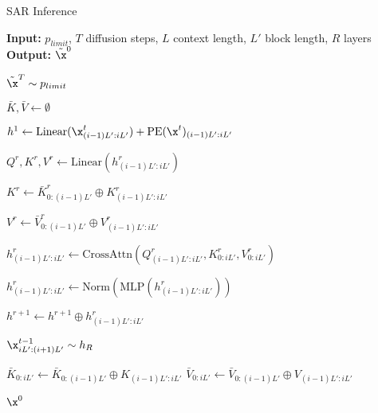 \begin{algorithm}
\caption{SAR Inference}
\begin{algorithmic}[1]
\State \textbf{Input:} $p_{limit}$, $T$ diffusion steps, $L$ context length, $L'$ block length, $R$ layers
\State \textbf{Output:} $\tilde{\x}^0$

\State $\tilde{\x}^T \sim p_{limit}$

\State $\bar{K}, \bar{V} \gets \emptyset$

        \State $h^1 \gets \text{Linear}(\x^t_{(i-1)L':iL'}) + \text{PE}(\x^t)_{(i-1)L':iL'}$
        
            \State $Q^r, K^r, V^r \gets \text{Linear}(h^r_{(i-1)L':iL'})$
            
            \State $K^r \gets \bar{K}^r_{0:(i-1)L'} \oplus K^r_{(i-1)L':iL'}$
            
            \State $V^r \gets \bar{V}^r_{0:(i-1)L'} \oplus V^r_{(i-1)L':iL'}$
            
            \State $h^r_{(i-1)L':iL'} \gets \text{CrossAttn}(Q^r_{(i-1)L':iL'}, K^r_{0:iL'}, V^r_{0:iL'})$
            
            \State $h^r_{(i-1)L':iL'} \gets \text{Norm}(\text{MLP}(h^r_{(i-1)L':iL'}))$
            
            \State $h^{r+1} \gets h^{r+1} \oplus h^r_{(i-1)L':iL'}$
        \EndFor
        
        \State $\x^{t-1}_{iL':(i+1)L'} \sim h_R$
    \EndFor
    
    \State $\bar{K}_{0:iL'} \gets \bar{K}_{0:(i-1)L'} \oplus K_{(i-1)L':iL'}$
    \State $\bar{V}_{0:iL'} \gets \bar{V}_{0:(i-1)L'} \oplus V_{(i-1)L':iL'}$
\EndFor

\State \Return $\x^0$
\end{algorithmic}
\end{algorithm}